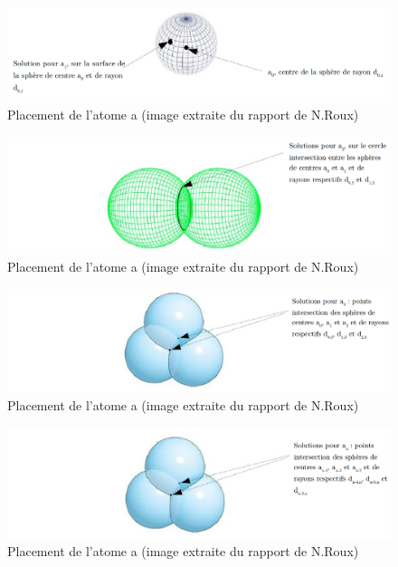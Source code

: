 \begin{figure}
	\centering
	\includegraphics[scale=0.27]{images/1_sphere.png}
	\caption{Placement de l'atome a (image extraite du rapport de N.Roux)}
\end{figure}

\begin{figure}
	\centering
	\includegraphics[scale=0.3]{images/2_spheres.png}
	\caption{Placement de l'atome a (image extraite du rapport de N.Roux)}
\end{figure}


\begin{figure}
	\centering
	\includegraphics[scale=0.3]{images/3_spheres.png}
	\caption{Placement de l'atome a (image extraite du rapport de N.Roux)}
\end{figure}


\begin{figure}
	\centering
	\includegraphics[scale=0.3]{images/3_spheres_gen.png}
	\caption{Placement de l'atome a (image extraite du rapport de N.Roux)}
\end{figure}

